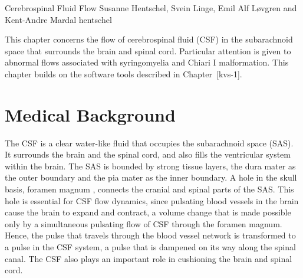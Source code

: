               {Cerebrospinal Fluid Flow}
              {Susanne Hentschel, Svein Linge, Emil Alf L{\o}vgren and Kent-Andre Mardal}
              {hentschel}


This chapter concerns the flow of cerebrospinal fluid (CSF) 
in the subarachnoid space that surrounds the brain and spinal cord. 
Particular attention is given to abnormal flows associated with syringomyelia and Chiari I malformation. 
This chapter builds on the software tools described in Chapter~[kvs-1]. 




\section{Medical Background}

The CSF is a clear water-like fluid that occupies the subarachnoid space (SAS).
It surrounds the brain and the spinal cord, and also fills the ventricular
system within the brain. The SAS is bounded by strong tissue layers, the dura
mater as the outer boundary and the pia mater as the inner boundary. A hole in
the skull basis, foramen magnum , connects the cranial
and spinal parts of the SAS. This hole is essential for CSF flow dynamics,
since pulsating blood vessels in the brain cause the brain to expand and
contract, a volume change that is made possible only by a simultaneous
pulsating flow of CSF through the foramen magnum. Hence, the pulse that travels
through the blood vessel network is transformed to a pulse in the CSF system, a
pulse that is dampened on its way along the spinal canal. The CSF also plays an
important role in cushioning the brain and spinal cord.


